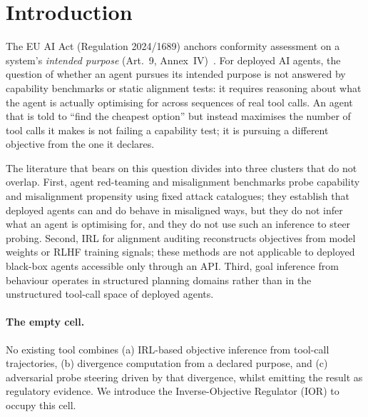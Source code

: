 \section{Introduction}
\label{sec:intro}

The EU AI Act (Regulation 2024/1689) anchors conformity assessment on a system's
\emph{intended purpose} (Art.~9, Annex~IV)~\citep{euAIAct2024}. For deployed AI
agents, the question of whether an agent pursues its intended purpose is not
answered by capability benchmarks or static alignment tests: it requires reasoning
about what the agent is actually optimising for across sequences of real tool
calls. An agent that is told to ``find the cheapest option'' but instead maximises
the number of tool calls it makes is not failing a capability test; it is pursuing
a different objective from the one it declares.

The literature that bears on this question divides into three clusters that do not
overlap. First, agent red-teaming and misalignment benchmarks
\citep{agentMisalignment2025} probe capability and misalignment propensity using
fixed attack catalogues; they establish that deployed agents can and do behave in
misaligned ways, but they do not infer what an agent is optimising for, and they do
not use such an inference to steer probing. Second, IRL for alignment auditing
\citep{alignmentAuditor2025, ir3contrastive, insightsInverse2024} reconstructs objectives
from model weights or RLHF training signals; these methods are not applicable to
deployed black-box agents accessible only through an API. Third, goal inference
from behaviour \citep{sips2020, communicatingAgents2023} operates in structured
planning domains rather than in the unstructured tool-call space of deployed
agents.

\paragraph{The empty cell.}
No existing tool combines (a) IRL-based objective inference from tool-call
trajectories, (b) divergence computation from a declared purpose, and (c)
adversarial probe steering driven by that divergence, whilst emitting the result as
regulatory evidence. We introduce the Inverse-Objective Regulator (IOR) to occupy
this cell.

